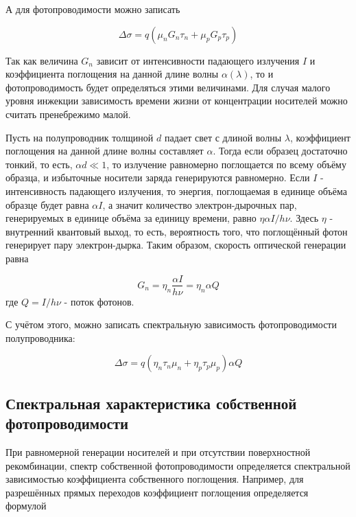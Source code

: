 А для фотопроводимости можно записать

\begin{equation}
\Delta \sigma = q (\mu_{n} G_{n} \tau_{n} + \mu_{p} G_{p} \tau_{p})
\end{equation}

Так как величина $G_{n}$ зависит от интенсивности падающего излучения $I$ и коэффициента поглощения на данной длине волны $\alpha(\lambda)$, то и фотопроводимость будет определяться этими величинами. Для случая малого уровня инжекции зависимость времени жизни от концентрации носителей можно считать пренебрежимо малой.

Пусть на полупроводник толщиной $d$ падает свет с длиной волны $\lambda$, коэффициент поглощения на данной длине волны составляет $\alpha$. Тогда если образец достаточно тонкий, то есть, $\alpha d \ll 1$, то излучение равномерно поглощается по всему объёму образца, и избыточные носители заряда генерируются равномерно. Если $I$ - интенсивность падающего излучения, то энергия, поглощаемая в единице объёма образце будет равна $\alpha I$, а значит количество электрон-дырочных пар, генерируемых в единице объёма за единицу времени, равно $\eta \alpha I / h \nu$. Здесь $\eta$ - внутренний квантовый выход, то есть, вероятность того, что поглощённый фотон генерирует пару электрон-дырка.
Таким образом, скорость оптической генерации равна

\begin{equation}
G_{n} = \eta_{n} \frac{\alpha I}{h \nu} = \eta_{n} \alpha Q
\end{equation}
где $Q = I / h \nu$  - поток фотонов.

С учётом этого, можно записать спектральную зависимость фотопроводимости полупроводника:

\begin{equation}
\Delta \sigma = q (\eta_{n} \tau_{n} \mu_{n} + \eta_{p} \tau_{p} \mu_{p}) \alpha Q
\end{equation}

\subsection{Спектральная характеристика собственной фотопроводимости}
При равномерной генерации носителей и при отсутствии поверхностной рекомбинации, спектр собственной фотопроводимости определяется спектральной зависимостью коэффициента собственного поглощения. Например, для разрешённых прямых переходов коэффициент поглощения определяется формулой

